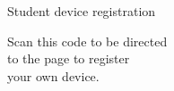 
\begin{minipage}[t]{1.0\linewidth}

\begin{center}
\vspace{2em}


{\large Student device registration}
\end{center}

\begin{center}

{\large Scan this code to be directed} \\
{\large to the page to register} \\
{\large your own device.} \\
\end{center}
\vspace{4em}


\end{minipage}
